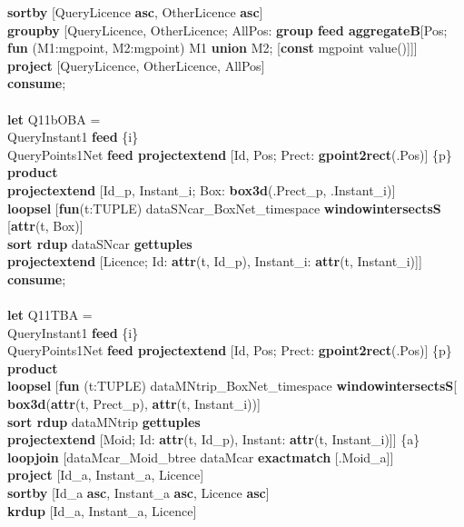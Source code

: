 \documentclass[a4paper]{article}
\newcommand{\op}[1]{\textbf{#1}}
\begin{document}
\begin{scriptsize}
\begin{tabbing}
\>\op{sortby} [QueryLicence \op{asc}, OtherLicence \op{asc}]\\
\>\op{groupby} [QueryLicence, OtherLicence; AllPos: \op{group feed aggregateB}[Pos;\\
\>\>\>\op{fun} (M1:mgpoint, M2:mgpoint) M1 \op{union} M2; [\op{const} mgpoint value()]]]\\
\>\op{project} [QueryLicence, OtherLicence, AllPos]\\
\op{consume};\\
\\
\op{let} Q11bOBA =\\
\>QueryInstant1 \op{feed} \{i\}\\
\>QueryPoints1Net \op{feed projectextend} [Id, Pos; Prect: \op{gpoint2rect}(.Pos)] \{p\}\\
\>\op{product}\\
\>\op{projectextend} [Id\_p, Instant\_i; Box: \op{box3d}(.Prect\_p, .Instant\_i)]\\
\>\op{loopsel} [\op{fun}(t:TUPLE) dataSNcar\_BoxNet\_timespace \op{windowintersectsS} [\op{attr}(t, Box)]\\
\>\>\op{sort rdup} dataSNcar \op{gettuples}\\
\>\>\op{projectextend} [Licence; Id: \op{attr}(t, Id\_p), Instant\_i: \op{attr}(t, Instant\_i)]]\\
\op{consume};\\
\\
\op{let} Q11TBA =\\
\>QueryInstant1 \op{feed} \{i\}\\
\>QueryPoints1Net \op{feed projectextend} [Id, Pos; Prect: \op{gpoint2rect}(.Pos)] \{p\}\\
\>\op{product}\\
\>\op{loopsel} [\op{fun} (t:TUPLE) dataMNtrip\_BoxNet\_timespace \op{windowintersectsS}[\\
\>\>\>\op{box3d}(\op{attr}(t, Prect\_p), \op{attr}(t, Instant\_i))]\\
\>\>\op{sort rdup} dataMNtrip \op{gettuples}\\
\>\>\op{projectextend} [Moid; Id: \op{attr}(t, Id\_p), Instant: \op{attr}(t, Instant\_i)]] \{a\}\\
\>\op{loopjoin} [dataMcar\_Moid\_btree dataMcar \op{exactmatch} [.Moid\_a]]\\
\>\op{project} [Id\_a, Instant\_a, Licence]\\
\>\op{sortby} [Id\_a \op{asc}, Instant\_a \op{asc}, Licence \op{asc}]\\
\>\op{krdup} [Id\_a, Instant\_a, Licence]\\

\end{tabbing}
\end{scriptsize}
\end{document}
